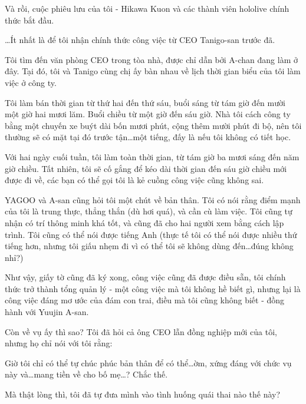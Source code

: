 \documentclass[../main.tex]{subfiles}
\begin{document}
Và rồi, cuộc phiêu lưu của tôi - Hikawa Kuon và các thành viên hololive chính thức bắt đầu. 

\ldots Ít nhất là để tôi nhận chính thức công việc từ CEO Tanigo-san trước đã.

\ct

Tôi tìm đến văn phòng CEO trong tòa nhà, được chỉ dẫn bởi A-chan đang làm ở đây. Tại đó, tôi và Tanigo cùng chị ấy bàn nhau về lịch thời gian biểu của tôi làm việc ở công ty. 

Tôi làm bán thời gian từ thứ hai đến thứ sáu, buổi sáng từ tám giờ đến mười một giờ hai mươi lăm. Buổi chiều từ một giờ đến sáu giờ. Nhà tôi cách công ty bằng một chuyến xe buýt dài bốn mươi phút, cộng thêm mười phút đi bộ, nên tôi thường sẽ có mặt tại đó trước tận\ldots một tiếng, đấy là nếu tôi không có tiết học.

Với hai ngày cuối tuần, tôi làm toàn thời gian, từ tám giờ ba mươi sáng đến năm giờ chiều. Tất nhiên, tôi sẽ cố gắng để kéo dài thời gian đến sáu giờ chiều mới được đi về, các bạn có thể gọi tôi là kẻ cuồng công việc cũng không sai.

YAGOO và A-san cũng hỏi tôi một chút về bản thân. Tôi có nói rằng điểm mạnh của tôi là trung thực, thẳng thắn (dù hơi quá), và cần cù làm việc. Tôi cũng tự nhận có trí thông minh khá tốt, và cũng đã cho hai người xem bằng cách lập trình. Tôi cũng có thể nói được tiếng Anh (thực tế tôi có thể nói được nhiều thứ tiếng hơn, nhưng tôi giấu nhẹm đi vì có thể tôi sẽ không dùng đến\ldots đúng không nhỉ?)

Như vậy, giấy tờ cũng đã ký xong, công việc cũng đã được điều sẵn, tôi chính thức trở thành tổng quản lý - một công việc mà tôi không hề biết gì, nhưng lại là công việc đáng mơ ước của đám con trai, điều mà tôi cũng không biết - đồng hành với Yuujin A-san.

Còn về vụ  ấy thì sao? Tôi đã hỏi cả ông CEO lẫn đồng nghiệp mới của tôi, nhưng họ chỉ nói với tôi rằng: 

Giờ tôi chỉ có thể tự chúc phúc bản thân để có thể\ldots ờm, xứng đáng với chức vụ này và\ldots mang tiền về cho bố mẹ\ldots? Chắc thế.

Mà thật lòng thì, tôi đã tự đưa mình vào tình huống quái thai nào thế này?
\end{document}
